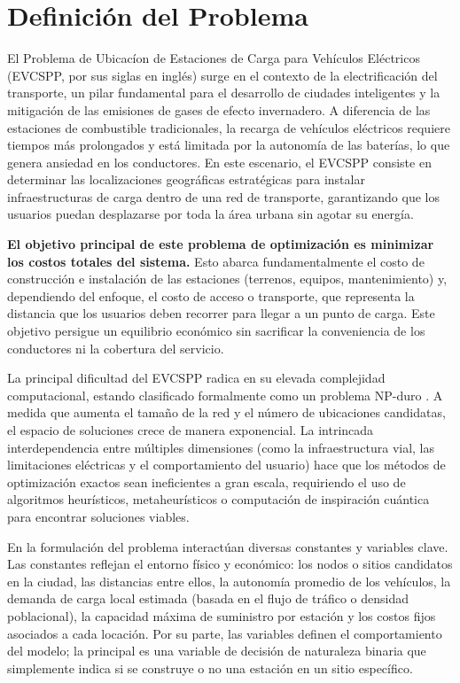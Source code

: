 \documentclass[letter, 10pt]{article}
\begin{document}
\section{Definici\'on del Problema}

El Problema de Ubicac\'ion de Estaciones de Carga para Veh\'iculos El\'ectricos (EVCSPP, por sus siglas en ingl\'es) surge en el contexto de la electrificaci\'on del transporte, un pilar fundamental para el desarrollo de ciudades inteligentes y la mitigaci\'on de las emisiones de gases de efecto invernadero. A diferencia de las estaciones de combustible tradicionales, la recarga de veh\'iculos el\'ectricos requiere tiempos m\'as prolongados y est\'a limitada por la autonom\'ia de las bater\'ias, lo que genera ansiedad en los conductores. En este escenario, el EVCSPP consiste en determinar las localizaciones geogr\'aficas estrat\'egicas para instalar infraestructuras de carga dentro de una red de transporte, garantizando que los usuarios puedan desplazarse por toda la \'area urbana sin agotar su energ\'ia.

\textbf{El objetivo principal de este problema de optimizaci\'on es minimizar los costos totales del sistema.} Esto abarca fundamentalmente el costo de construcci\'on e instalaci\'on de las estaciones (terrenos, equipos, mantenimiento) y, dependiendo del enfoque, el costo de acceso o transporte, que representa la distancia que los usuarios deben recorrer para llegar a un punto de carga. Este objetivo persigue un equilibrio econ\'omico sin sacrificar la conveniencia de los conductores ni la cobertura del servicio.


La principal dificultad del EVCSPP radica en su elevada complejidad computacional, estando clasificado formalmente como un problema NP-duro \cite{1_Solving_optimal_evcsp_problem_QUANTUM}\cite{2_EVCSP_2013-ieee-conference}.
A medida que aumenta el tama\~no de la red y el n\'umero de ubicaciones candidatas, el espacio de soluciones crece de manera exponencial. La intrincada interdependencia entre m\'ultiples dimensiones (como la infraestructura vial, las limitaciones el\'ectricas y el comportamiento del usuario) hace que los m\'etodos de optimizaci\'on exactos sean ineficientes a gran escala, requiriendo el uso de algoritmos heur\'isticos, metaheur\'isticos o computaci\'on de inspiraci\'on cu\'antica para encontrar soluciones viables.

En la formulaci\'on del problema interact\'uan diversas constantes y variables clave. Las constantes reflejan el entorno f\'isico y econ\'omico: los nodos o sitios candidatos en la ciudad, las distancias entre ellos, la autonom\'ia promedio de los veh\'iculos, la demanda de carga local estimada (basada en el flujo de tr\'afico o densidad poblacional), la capacidad m\'axima de suministro por estaci\'on y los costos fijos asociados a cada locaci\'on. Por su parte, las variables definen el comportamiento del modelo; la principal es una variable de decisi\'on de naturaleza binaria que simplemente indica si se construye o no una estaci\'on en un sitio espec\'ifico\cite{1_Solving_optimal_evcsp_problem_QUANTUM}.
\end{document}
